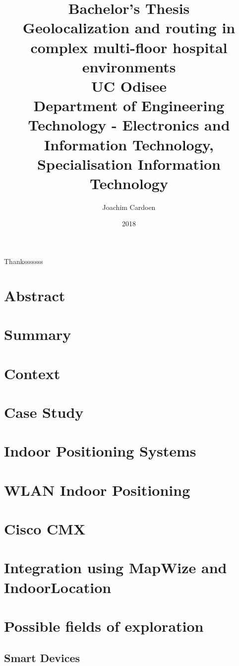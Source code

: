 \documentclass[11pt,twoside]{report}
\title{
    {\large Bachelor's Thesis}\\
    {Geolocalization and routing in complex multi-floor hospital environments}\\
    {\large UC Odisee}\\
    {\large Department of Engineering Technology - Electronics and Information Technology, Specialisation Information Technology}
}
\author{Joachim Cardoen}
\date{2018}
\begin{document}
\begin{titlepage}
\maketitle
\end{titlepage}
\begin{center}
Thanksssssss
\end{center}
\chapter*{Abstract}
\tableofcontents
\clearpage
\printglossary[type=\acronymtype]
\printglossary
\clearpage
\listoffigures
\clearpage
\listoftables
\chapter{Summary}
\chapter{Context}

\chapter{Case Study}

\chapter{Indoor Positioning Systems}

\chapter{WLAN Indoor Positioning}

\chapter{Cisco CMX}

\chapter{Integration using MapWize and IndoorLocation}

\chapter{Possible fields of exploration}
\section{Smart Devices}
\end{document}
